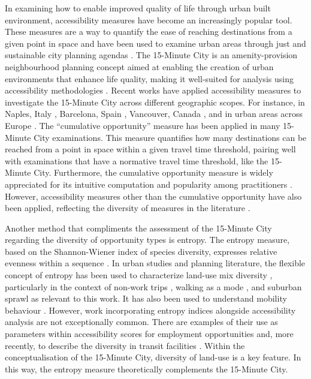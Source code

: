 \documentclass[
  authoryear,
  preprint,
  3p]{elsarticle}
\begin{document}
In examining how to enable improved quality of life through urban built
environment, accessibility measures have become an increasingly popular
tool. These measures are a way to quantify the ease of reaching
destinations from a given point in space and have been used to examine
urban areas through just and sustainable city planning agendas
\citep{vale2023accessibility, handyAccessibilityIdeaWhose2020}. The
15-Minute City is an amenity-provision neighbourhood planning concept
aimed at enabling the creation of urban environments that enhance life
quality, making it well-suited for analysis using accessibility
methodologies \citep{guzmanProximityEnoughCritical2024}. Recent works
have applied accessibility measures to investigate the 15-Minute City
across different geographic scopes. For instance, in Naples, Italy
\citep{gaglioneUrbanAccessibility15minute2022}, Barcelona, Spain
\citep{graellsCityCitiesMeasuring2021}, Vancouver, Canada
\citep{hosford15minuteCityReach2022}, and in urban areas across Europe
\citep{vale2023accessibility}. The ``cumulative opportunity'' measure
has been applied in many 15-Minute City examinations. This measure
quantifies how many destinations can be reached from a point in space
within a given travel time threshold, pairing well with examinations
that have a normative travel time threshold, like the 15-Minute City.
Furthermore, the cumulative opportunity measure is widely appreciated
for its intuitive computation and popularity among practitioners
\citep{handyAccessibilityIdeaWhose2020, handyMeasuringAccessibilityExploration1997, chengInvestigatingWalkingAccessibility2019}.
However, accessibility measures other than the cumulative opportunity
have also been applied, reflecting the diversity of measures in the
literature \citep{guzmanProximityEnoughCritical2024}.

Another method that compliments the assessment of the 15-Minute City
regarding the diversity of opportunity types is entropy. The entropy
measure, based on the Shannon-Wiener index of species diversity,
expresses relative evenness within a sequence
\citep{whittaker1972evolution}. In urban studies and planning
literature, the flexible concept of entropy has been used to
characterize land-use mix diversity
\citep{frankLinkingObjectivelyMeasured2005, ewingTravelBuiltEnvironment2010a},
particularly in the context of non-work trips
\citep{cerveroTravelDemand3Ds1997}, walking as a mode
\citep{luUrbanDensityDiversity2017, mavoaIdentifyingAppropriateLanduse2018},
and suburban sprawl \citep{randallGISBasedLand2015} as relevant to this
work. It has also been used to understand mobility behaviour
\citep{mcbride2020exploration, montero2023applying, montero2023role}.
However, work incorporating entropy indices alongside accessibility
analysis are not exceptionally common. There are examples of their use
as parameters within accessibility scores for employment opportunities
\citep{chengMeasuringUrbanJob2013, daiIncorporatingJobDiversity2018}
and, more recently, to describe the diversity in transit facilities
\citep{yinIncorporatingFacilityDiversity2024}. Within the
conceptualisation of the 15-Minute City, diversity of land-use is a key
feature. In this way, the entropy measure theoretically complements the
15-Minute City.
\end{document}
